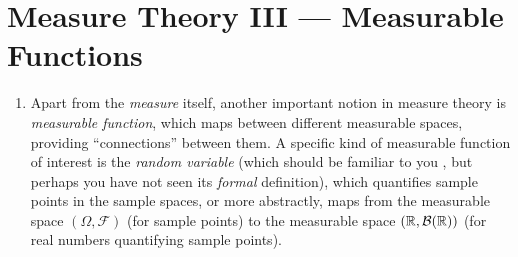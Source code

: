\section{Measure Theory III --- Measurable Functions}
\label{sect:meas-fn}
\begin{enumerate}
\item Apart from the \emph{measure} itself, another important notion in measure
theory is \emph{measurable function}, which maps between different measurable
spaces, providing ``connections'' between them. A specific kind of measurable
function of interest is the \emph{random variable} (which should be familiar to
you , but perhaps you have not seen its
\emph{formal} definition), which quantifies sample points in the sample spaces,
or more abstractly, maps from the measurable space \((\Omega,\mathcal{F})\)
(for sample points) to the measurable space \((\mathbb{R},\mathcal{B}(\mathbb{R}))\) (for real
numbers quantifying sample points).
\end{enumerate}
